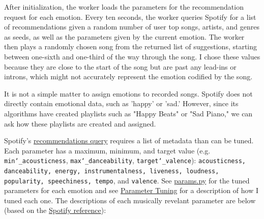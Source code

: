 \documentclass{article}
\renewcommand{\_}[1]{\underline{ #1 }}
\theoremstyle{definition}
\begin{document}
After initialization, the worker loads the parameters for the recommendation request for each emotion. Every ten seconds, the worker queries Spotify for a list of recommendations given a random number of user top songs, artists, and genres as seeds, as well as the parameters given by the current emotion. The worker then plays a randomly chosen song from the returned list of suggestions, starting between one-sixth and one-third of the way through the song. I chose these values because they are close to the start of the song but are past any lead-ins or introns, which might not accurately represent the emotion codified by the song.

It is not a simple matter to assign emotions to recorded songs. Spotify does not directly contain emotional data, such as 'happy' or 'sad.' However, since its algorithms have created playlists such as "Happy Beats" or "Sad Piano," we can ask how these playlists are created and assigned. 

Spotify's \href{https://developer.spotify.com/documentation/web-api/reference/#/operations/get-recommendationsrecommendation}{recommendations query} requires a list of metadata than can be tuned. Each parameter has a maximum, minimum, and target value (e.g. \texttt{min\char`_acousticness}, \texttt{max\char`_danceability}, \texttt{target\char`_valence}): \texttt{acousticness, danceability, energy, instrumentalness, liveness, loudness, popularity, speechiness, tempo}, and \texttt{valence}. See \href{https://github.com/as4mo3/face-the-music/blob/master/params.py}{params.py} for the tuned parameters for each emotion and see \hyperref[Parameter Tuning]{Parameter Tuning} for a description of how I tuned each one. The descriptions of each musically revelant parameter are below (based on the \href{https://developer.spotify.com/documentation/web-api/reference/#/operations/get-audio-features}{Spotify reference}):
\end{document}
